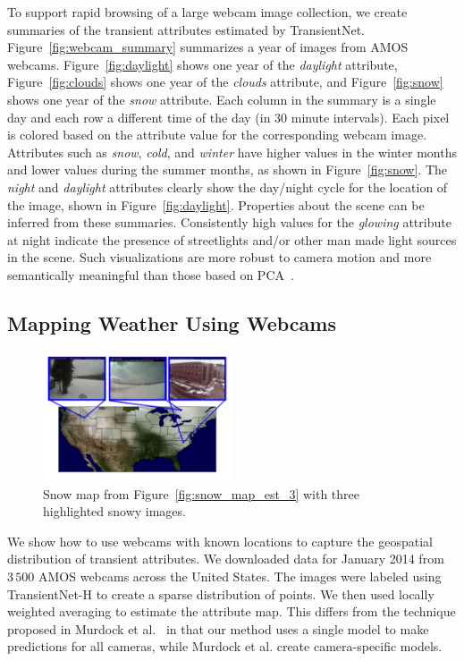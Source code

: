 \documentclass[10pt,twocolumn,letterpaper]{article}
\newcommand{\figref}[1]{Figure~\ref{fig:#1}}
\begin{document}
To support rapid browsing of a large webcam image collection, we create
summaries of the transient attributes estimated by TransientNet.
\figref{webcam_summary} summarizes a year of images from AMOS webcams.
\figref{daylight} shows one year of the \emph{daylight} attribute,
\figref{clouds} shows one year of the \emph{clouds} attribute, and
\figref{snow} shows one year of the \emph{snow} attribute.  Each column in the
summary is a single day and each row a different time of the day (in 30 minute
intervals).  Each pixel is colored based on the attribute value for the
corresponding webcam image. Attributes such as \textit{snow}, \textit{cold},
and \textit{winter} have higher values in the winter months and lower values
during the summer months, as shown in \figref{snow}. The \textit{night} and
\textit{daylight} attributes clearly show the day/night cycle for the location
of the image, shown in \figref{daylight}.  Properties about the scene can be
inferred from these summaries.  Consistently high values for the
\textit{glowing} attribute at night indicate the presence of streetlights
and/or other man made light sources in the scene.  Such visualizations are more
robust to camera motion and more semantically meaningful than those based on
PCA~\cite{jacobs09webcamdata}.

\subsection{Mapping Weather Using Webcams}

\begin{figure}[t]
	\centering
		\includegraphics[width=0.5\textwidth, trim= 0mm 10mm 0mm 0mm]{figs/snow_exs.pdf}
		\caption{Snow map from \figref{snow_map_est_3} with three highlighted snowy 
             images.}
		\label{fig:snow_exs}
\end{figure}

We show how to use webcams with known locations to capture the geospatial
distribution of transient attributes. We downloaded data for January 2014 from
$3\,500$ AMOS webcams across the United States.  The images were labeled using
TransientNet-H to create a sparse distribution of points.  We then used locally
weighted averaging to estimate the attribute map.  This differs from the
technique proposed in Murdock et al.~\cite{murdock13clouds, murdock2015cloudmap}
in that our method uses a single model to make predictions for all cameras,
while Murdock et al.  create camera-specific models.
\end{document}
